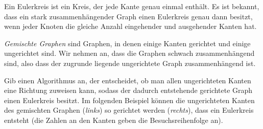 \documentclass{uebung_cs}
\begin{document}
\newpage
\begin{aufgabe}
    Ein Eulerkreis ist ein Kreis, der jede Kante genau einmal enthält.
    Es ist bekannt, dass ein stark zusammenhängender Graph einen Eulerkreis genau dann besitzt, wenn jeder Knoten die gleiche Anzahl eingehender und ausgehender Kanten hat.

	\emph{Gemischte Graphen} sind Graphen, in denen einige Kanten gerichtet und einige ungerichtet sind. Wir nehmen an, dass die Graphen schwach zusammenhängend sind, also dass der zugrunde liegende ungerichtete Graph zusammenhängend ist. 
    
    Gib einen Algorithmus an, der entscheidet, ob man allen ungerichteten Kanten eine Richtung zuweisen kann, sodass der dadurch entstehende gerichtete Graph einen Eulerkreis besitzt. Im folgenden Beispiel können die ungerichteten Kanten des gemischten Graphen (\emph{links}) so gerichtet werden (\emph{rechts}), dass ein Eulerkreis entsteht (die Zahlen an den Kanten geben die Besuchsreihenfolge an).

    \begin{figure}[ht]
    	\begin{minipage}[b]{0.5\textwidth}
    		\centering
    	\end{minipage}
    	\begin{minipage}[b]{0.5\textwidth}
    		\centering
\end{minipage}
\end{figure}
\end{aufgabe}
\end{document}
